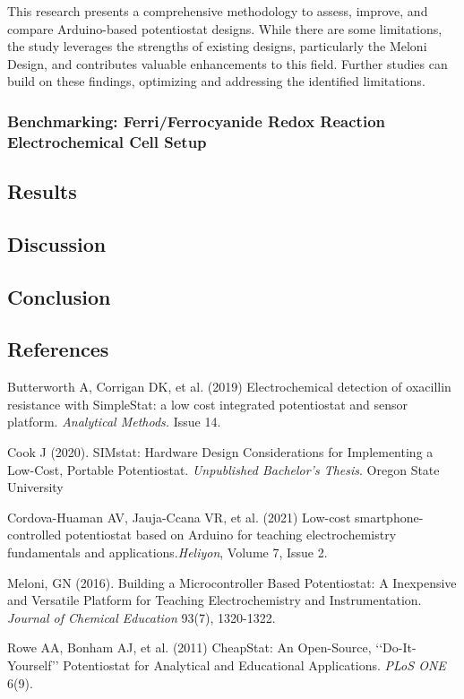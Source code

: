 \documentclass{article}
\begin{document}
This research presents a comprehensive methodology to assess, improve, and compare Arduino-based potentiostat designs. While there are some limitations, the study leverages the strengths of existing designs, particularly the Meloni Design, and contributes valuable enhancements to this field. Further studies can build on these findings, optimizing and addressing the identified limitations.

\subsubsection*{Benchmarking: Ferri/Ferrocyanide Redox Reaction Electrochemical Cell Setup}

\subsection*{Results}

\subsection*{Discussion}
\subsection*{Conclusion}

\subsection*{References}
Butterworth A, Corrigan DK, et al. (2019) Electrochemical detection of oxacillin resistance with SimpleStat: a low cost integrated potentiostat and sensor platform. \emph{Analytical Methods.} Issue 14. 

Cook J (2020). SIMstat: Hardware Design Considerations for Implementing a Low-Cost, Portable Potentiostat. \emph{Unpublished Bachelor's Thesis}. Oregon State University

Cordova-Huaman AV, Jauja-Ccana VR, et al. (2021) Low-cost smartphone-controlled potentiostat based on Arduino for teaching electrochemistry fundamentals and applications.\emph{Heliyon}, Volume 7, Issue 2. 

Meloni, GN (2016). Building a Microcontroller Based Potentiostat: A Inexpensive and Versatile Platform for Teaching Electrochemistry and Instrumentation. \emph{Journal of Chemical Education} 93(7), 1320-1322. 

Rowe AA, Bonham AJ, et al. (2011) CheapStat: An Open-Source, ‘‘Do-It-Yourself’’ Potentiostat for Analytical and Educational Applications. \emph{PLoS ONE} 6(9).
\end{document}
